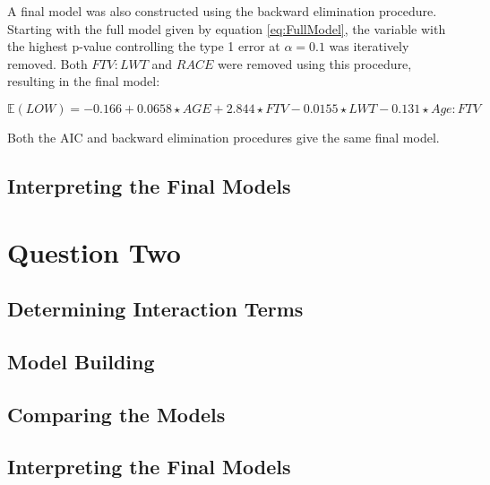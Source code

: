 A final model was also constructed using the backward elimination procedure. Starting with the full model given by equation \ref{eq:FullModel}, the variable with the highest p-value controlling the type 1 error at $\alpha = 0.1$ was iteratively removed. Both $FTV:LWT$ and $RACE$ were removed using this procedure, resulting in the final model:

\begin{equation}
    \mathbb{E}(LOW) = -0.166 + 0.0658 \star AGE + 2.844 \star FTV -0.0155 \star LWT - 0.131 \star Age:FTV 
\end{equation}

Both the AIC and backward elimination procedures give the same final model.

\subsection{Interpreting the Final Models}

\section{Question Two}

\subsection{Determining Interaction Terms}

\subsection{Model Building} \label{BuildingTwo}

\subsection{Comparing the Models}

\subsection{Interpreting the Final Models}